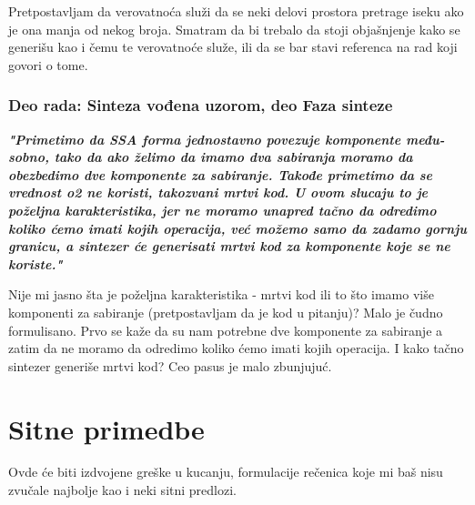 \documentclass[a4paper]{report}
\begin{document}
Pretpostavljam da verovatnoća služi da se neki delovi prostora pretrage iseku ako je ona manja od nekog broja. Smatram da bi trebalo da stoji objašnjenje kako se generišu kao i čemu te verovatnoće služe, ili da se bar stavi referenca na rad koji govori o tome.  


\subsubsection{Deo rada: Sinteza vođena uzorom, deo Faza sinteze}
\textbf{\textit{"Primetimo da SSA forma jednostavno povezuje komponente među-sobno, tako da ako želimo da imamo dva sabiranja moramo da obezbedimo dve komponente za sabiranje. Takođe primetimo da se vrednost o2 ne koristi, takozvani mrtvi kod. U ovom slucaju to je poželjna karakteristika,
jer ne moramo unapred tačno da odredimo koliko ćemo imati kojih operacija, već možemo samo da zadamo gornju granicu, a sintezer će generisati mrtvi kod za komponente koje se ne koriste."}}

Nije mi jasno šta je poželjna karakteristika - mrtvi kod ili to što imamo više komponenti za sabiranje (pretpostavljam da je kod u pitanju)? Malo je čudno formulisano. Prvo se kaže da su nam potrebne dve komponente za sabiranje a zatim da ne moramo da odredimo koliko ćemo imati kojih operacija. I kako tačno sintezer generiše mrtvi kod? Ceo pasus je malo zbunjujuć.



\section{Sitne primedbe}
Ovde će biti izdvojene greške u kucanju, formulacije rečenica koje mi baš nisu zvučale najbolje kao i neki sitni predlozi.
\end{document}
